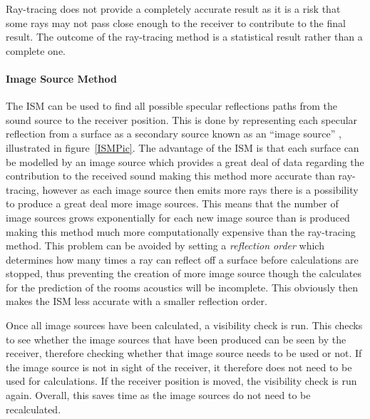 \documentclass[../../main.tex]{subfiles}
\begin{document}
		Ray-tracing does not provide a completely accurate result as it is a risk that some rays may not pass close enough to the receiver to contribute to the final result. The outcome of the ray-tracing method is a statistical result rather than a complete one.

	\paragraph{Image Source Method}
	

		The \ac{ISM} can be used to find all possible specular reflections paths from the sound source to the receiver position. This is done by representing each specular reflection from a surface as a secondary source known as an ``image source'' \cite{Rindel1995}, illustrated in figure~\ref{ISMPic}. The advantage of the \ac{ISM} is that each surface can be modelled by an image source which provides a great deal of data regarding the contribution to the received sound making this method more accurate than ray-tracing, however as each image source then emits more rays there is a possibility to produce a great deal more image sources. This means that the number of image sources grows exponentially for each new image source than is produced making this method much more computationally expensive than the ray-tracing method. This problem can be avoided by setting a \textit{reflection order} which determines how many times a ray can reflect off a surface before calculations are stopped, thus preventing the creation of more image source though the calculates for the prediction of the rooms acoustics will be incomplete. This obviously then makes the \ac{ISM} less accurate with a smaller reflection order.

		Once all image sources have been calculated, a visibility check is run. This checks to see whether the image sources that have been produced can be seen by the receiver, therefore checking whether that image source needs to be used or not. If the image source is not in sight of the receiver, it therefore does not need to be used for calculations. If the receiver position is moved, the visibility check is run again. Overall, this saves time as the image sources do not need to be recalculated.
\end{document}
